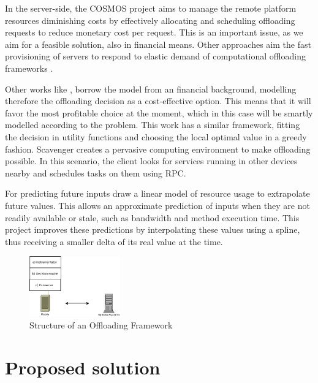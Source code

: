 \documentclass[10pt, conference, letterpaper]{IEEEtran}
\begin{document}
  In the server-side, the COSMOS \cite{Shi:2014:CCO:2632951.2632958} project aims to manage the remote platform resources diminishing costs by effectively allocating and scheduling offloading requests to reduce monetary cost per request. This is an important issue, as we aim for a feasible solution, also in financial means. Other approaches aim the fast provisioning of servers to respond to elastic demand of computational offloading frameworks \cite{Ha:2013:JPC:2462456.2464451}.

  Other works like \cite{6162380}, borrow the model from an financial background, modelling therefore the offloading decision as a cost-effective option. This means that it will favor the most profitable choice at the moment, which in this case will be smartly modelled according to the problem. This work has a similar framework, fitting the decision in utility functions and choosing the local optimal value in a greedy fashion. Scavenger \cite{5466972} creates a pervasive computing environment to make offloading possible. In this scenario, the client looks for services running in other devices nearby and schedules tasks on them using RPC.

  For predicting future inputs \cite{Balan:2003:TRE:1066116.1066125} \cite{Cuervo:2010:MMS:1814433.1814441} \cite{kosta2012thinkair} draw a linear model of resource usage to extrapolate future values. This allows an approximate prediction of inputs when they are not readily available or stale, such as bandwidth and method execution time. This project improves these predictions by interpolating these values using a spline, thus receiving a smaller delta of its real value at the time.

\begin{figure}[!t]
  \centering
  \includegraphics[width=0.35\textwidth]{imgs/system.jpeg}
  \caption{Structure of an Offloading Framework}
  \label{fig:systemDiagram}
\end{figure}

  \section{Proposed solution} \label{sec:design}
\end{document}
